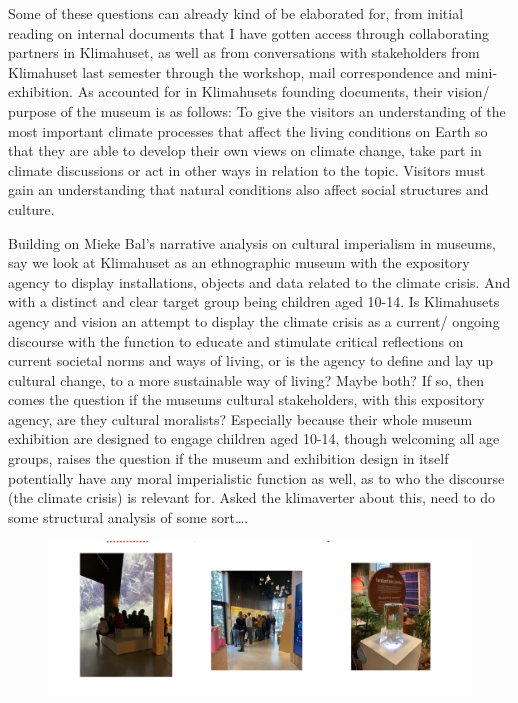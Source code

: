 Some of these questions can already kind of be elaborated for, from initial reading on internal documents that I have gotten access through collaborating partners in Klimahuset, as well as from conversations with stakeholders from Klimahuset last semester through the workshop, mail correspondence and mini-exhibition. As accounted for in Klimahusets founding documents, their vision/ purpose of the museum is as follows:
To give the visitors an understanding of the most important climate processes that affect the living conditions on Earth so that they are able to develop their own views on climate change, take part in climate discussions or act in other ways in relation to the topic.
Visitors must gain an understanding that natural conditions also affect social structures and culture.
	
Building on Mieke Bal’s narrative analysis on cultural imperialism in museums, say we look at Klimahuset as an ethnographic museum with the expository agency to display installations, objects and data related to the climate crisis. And with a distinct and clear target group being children aged 10-14. Is Klimahusets agency and vision an attempt to display the climate crisis as a current/ ongoing discourse with the function to educate and stimulate critical reflections on current societal norms and ways of living, or is the agency to define and lay up cultural change, to a more sustainable way of living? Maybe both? If so, then comes the question if the museums cultural stakeholders, with this expository agency, are they cultural moralists? Especially because their whole museum exhibition are designed to engage children aged 10-14, though welcoming all age groups, raises the question if the museum and exhibition design in itself potentially have any moral imperialistic function as well, as to who the discourse (the climate crisis) is relevant for. 
Asked the klimaverter about  this, need to do some structural analysis of some sort….

\begin{figure}[h]
\includegraphics[width=13cm]{pictures/elever_i_klimahuset.png}
\centering 
\end{figure}

